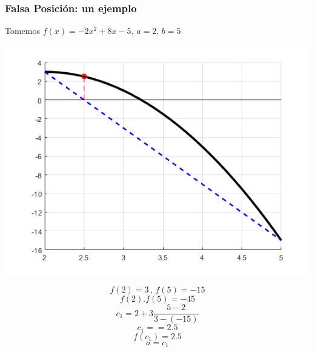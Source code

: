 \documentclass[xcolor=svgnames]{beamer} %
\theoremstyle{plain}
\theoremstyle{definition}
\begin{document}
\begin{frame}
\frametitle{Falsa Posición: un ejemplo}
Tomemos $f(x) = -2x^2+8x-5, \, a=2, \, b=5$
\begin{minipage}{.7\linewidth}
\includegraphics[scale=.5]{FalsaPosicion/f1.png} 
\end{minipage}
\begin{minipage}{.25\linewidth}
$$f(2)=3 \,,\,f(5)=-15$$
$$f(2).f(5) = -45$$\vspace{7pt}
$$c_1 = 2 +3\frac{5-2}{3-(-15)}$$
$$c_1 = = 2.5 $$
$$f(c_1) = 2.5 $$\vspace{7pt}
$$ a = c_1$$
\end{minipage}
\end{frame}
\end{document}
